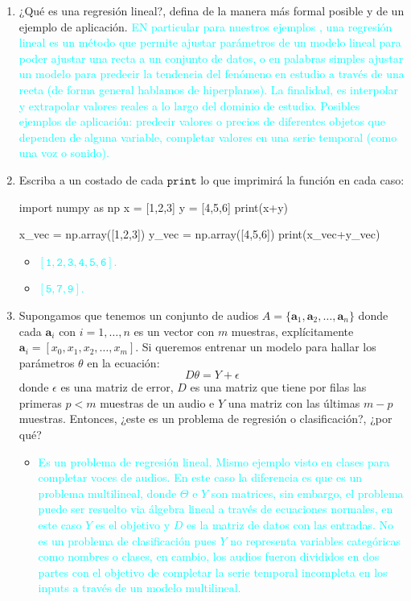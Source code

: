 \documentclass{exam}
\theoremstyle{definition}
\begin{document}
\begin{enumerate}
\item ¿Qué es una regresión lineal?, defina de la manera más formal posible y de un ejemplo de aplicación.
\textcolor{cyan}{EN particular para nuestros ejemplos , una regresión lineal es un método que permite ajustar parámetros de un modelo lineal para poder ajustar una recta a un conjunto de datos, o en palabras simples ajustar un modelo para predecir la tendencia del fenómeno en estudio a través de una recta (de forma general hablamos de hiperplanos). La finalidad, es interpolar y extrapolar valores reales a lo largo del dominio de estudio. Posibles ejemplos de aplicación: predecir valores o precios de diferentes objetos que dependen de alguna variable, completar valores en una serie temporal (como una voz o sonido).} 

\item Escriba a un costado de cada $\mathtt{print}$ lo que imprimirá la función en cada caso:
    \begin{python}
    import numpy as np
     x = [1,2,3]
     y = [4,5,6]
     print(x+y)
    
     x_vec = np.array([1,2,3])
     y_vec = np.array([4,5,6])
     print(x_vec+y_vec)
 
    \end{python}
    \begin{itemize}
        \item \textcolor{cyan}{$\mathtt{[1,2,3,4,5,6]}$.} 
        \item  \textcolor{cyan}{$\mathtt{[5,7,9]}$.} 
    \end{itemize}
\item Supongamos que tenemos un conjunto de audios $A = \{\mathbf{a}_1, \mathbf{a}_2,\dots,\mathbf{a}_n\}$ donde cada $\mathbf{a}_i$ con $i = 1,\dots, n$ es un vector con $m$ muestras, explícitamente $\mathbf{a}_i = [x_0,x_1,x_2,\dots,x_m]$. Si queremos entrenar un modelo para hallar los parámetros $\theta$ en la ecuación:
\begin{equation}
    D \theta = Y + \epsilon
\end{equation}
donde $\epsilon$ es una matriz de error, $D$ es una matriz que tiene por filas las primeras $p<m$ muestras de un audio e $Y$ una matriz con las últimas $m-p$ muestras. Entonces, ¿este es un problema de regresión o clasificación?, ¿por qué?
\begin{itemize}
    \item \textcolor{cyan}{Es un problema de regresión lineal. Mismo ejemplo visto en clases para completar voces de audios. En este caso la diferencia es que es un problema multilineal, donde $\Theta$ e $Y$ son matrices, sin embargo, el problema puede ser resuelto via álgebra lineal a través de ecuaciones normales, en este caso $Y$ es el objetivo y $D$ es la matriz de datos con las entradas. No es un problema de clasificación pues $Y$ no representa variables categóricas como nombres o clases, en cambio, los audios fueron divididos en dos partes con el objetivo de completar la serie temporal incompleta en los inputs a través de un modelo multilineal.} 
\end{itemize}


\end{enumerate}
\end{document}
